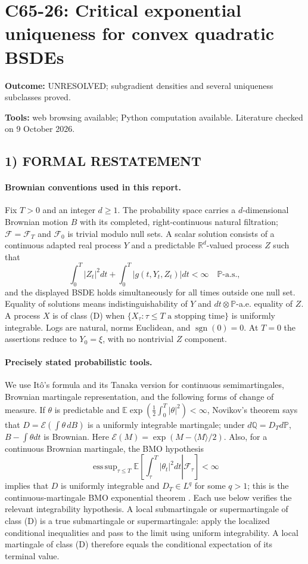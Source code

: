 \documentclass[11pt,a4paper]{article}
\newcommand{\R}{\mathbb R}
\newcommand{\E}{\mathbb E}
\newcommand{\Pp}{\mathbb P}
\newcommand{\Q}{\mathbb Q}
\newcommand{\F}{\mathcal F}
\newcommand{\cE}{\mathcal E}
\newcommand{\sgn}{\operatorname{sgn}}
\DeclareMathOperator*{\esssup}{ess\,sup}
\theoremstyle{definition}
\begin{document}
\section*{C65-26: Critical exponential uniqueness for convex quadratic BSDEs}
\textbf{Outcome:} UNRESOLVED; subgradient densities and several uniqueness subclasses proved.\par\textbf{Tools:} web browsing available; Python computation available. Literature checked on 9 October 2026.
\subsection*{1) FORMAL RESTATEMENT}
\paragraph{Brownian conventions used in this report.}
Fix $T>0$ and an integer $d\ge1$. The probability space carries a $d$-dimensional Brownian motion $B$ with its completed, right-continuous natural filtration; $\F=\F_T$ and $\F_0$ is trivial modulo null sets. A scalar solution consists of a continuous adapted real process $Y$ and a predictable $\R^d$-valued process $Z$ such that
\[
 \int_0^T |Z_t|^2dt+\int_0^T|g(t,Y_t,Z_t)|dt<\infty\quad\Pp\text{-a.s.},
\]
and the displayed BSDE holds simultaneously for all times outside one null set. Equality of solutions means indistinguishability of $Y$ and $dt\otimes\Pp$-a.e. equality of $Z$. A process $X$ is of class (D) when $\{X_\tau:\tau\le T\text{ a stopping time}\}$ is uniformly integrable. Logs are natural, norms Euclidean, and $\sgn(0)=0$. At $T=0$ the assertions reduce to $Y_0=\xi$, with no nontrivial $Z$ component.

\paragraph{Precisely stated probabilistic tools.}
We use It\^o's formula and its Tanaka version for continuous semimartingales, Brownian martingale representation, and the following forms of change of measure. If $\theta$ is predictable and $\E\exp(\frac12\int_0^T|\theta|^2)<\infty$, Novikov's theorem says that
$D=\cE(\int\theta\,dB)$ is a uniformly integrable martingale; under $d\Q=D_Td\Pp$, $B-\int\theta dt$ is Brownian. Here $\cE(M)=\exp(M-\langle M\rangle/2)$. Also, for a continuous Brownian martingale, the BMO hypothesis
\[
 \esssup_{\tau\le T}\E\left[\left.\int_\tau^T|\theta_t|^2dt\right|\F_\tau\right]<\infty
\]
implies that $D$ is uniformly integrable and $D_T\in L^q$ for some $q>1$; this is the continuous-martingale BMO exponential theorem \cite{Kazamaki}. Each use below verifies the relevant integrability hypothesis. A local submartingale or supermartingale of class (D) is a true submartingale or supermartingale: apply the localized conditional inequalities and pass to the limit using uniform integrability. A local martingale of class (D) therefore equals the conditional expectation of its terminal value.
\end{document}
